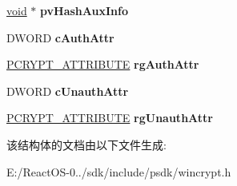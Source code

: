 \begin{DoxyCompactItemize}
\hyperlink{interfacevoid}{void} $\ast$ {\bfseries pv\+Hash\+Aux\+Info}
\item 
\mbox{\label{struct___c_m_s_g___s_i_g_n_e_r___e_n_c_o_d_e___i_n_f_o_a67601de2465be61d4d07528cec994031}} 
D\+W\+O\+RD {\bfseries c\+Auth\+Attr}
\item 
\mbox{\label{struct___c_m_s_g___s_i_g_n_e_r___e_n_c_o_d_e___i_n_f_o_a3736758a6068cd3b294cb7e3c04fccfa}} 
\hyperlink{struct___c_r_y_p_t___a_t_t_r_i_b_u_t_e}{P\+C\+R\+Y\+P\+T\+\_\+\+A\+T\+T\+R\+I\+B\+U\+TE} {\bfseries rg\+Auth\+Attr}
\item 
\mbox{\label{struct___c_m_s_g___s_i_g_n_e_r___e_n_c_o_d_e___i_n_f_o_ad9e027e256c24574ce350c92611c0276}} 
D\+W\+O\+RD {\bfseries c\+Unauth\+Attr}
\item 
\mbox{\label{struct___c_m_s_g___s_i_g_n_e_r___e_n_c_o_d_e___i_n_f_o_acd0741f65bb74f8b31c7bc58f309b2d5}} 
\hyperlink{struct___c_r_y_p_t___a_t_t_r_i_b_u_t_e}{P\+C\+R\+Y\+P\+T\+\_\+\+A\+T\+T\+R\+I\+B\+U\+TE} {\bfseries rg\+Unauth\+Attr}
\end{DoxyCompactItemize}


该结构体的文档由以下文件生成\+:\begin{DoxyCompactItemize}
\item 
E\+:/\+React\+O\+S-\/0../sdk/include/psdk/wincrypt.\+h\end{DoxyCompactItemize}
